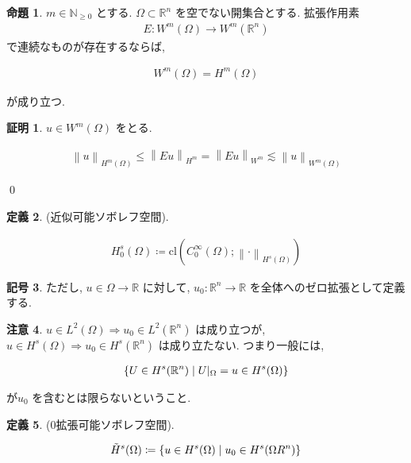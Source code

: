 \documentclass[10pt, fleqn, label-section=none]{bxjsarticle}
\theoremstyle{definition}
\newtheorem{dfn}{定義}[section]
\newtheorem{prop}[dfn]{命題}
\newtheorem{notation}[dfn]{記号}
\newtheorem*{pf*}{証明}
\newtheorem{remark}[dfn]{注意}
\newcommand{\cbra}[1]{\mleft\{#1\mright\}}
\newcommand{\norm}[1]{\left\|#1\right\|}
\newcommand{\naraba}{\Rightarrow}
\renewcommand{\;}{\, ; \,}
\begin{document}
\begin{prop}$m \in \mathbb N_{\geq 0 }$ とする. $\Omega \subset \mathbb R^n$ を空でない開集合とする. 拡張作用素
\begin{align*} E: W^m(\Omega) \rightarrow W^m(\mathbb R^n) \end{align*}
で連続なものが存在するならば, 

\begin{align*} W^m(\Omega) = H^m(\Omega ) \end{align*}

が成り立つ. 

\end{prop}
\begin{pf*}$u \in W^m(\Omega)$ をとる. 

\begin{align*} \norm u _{H^m(\Omega)} \leq \norm{Eu}_{H^m} = \norm{Eu}_{W^m} \lesssim \norm{u}_{W^m(\Omega)} \end{align*}

\qed
\end{pf*}




\begin{dfn}(近似可能ソボレフ空間). 

\begin{align*} H_0^s (\Omega ) \coloneqq \textrm{cl}(C_0^\infty(\Omega) ; \norm{\cdot}_{H^s(\Omega)} ) \end{align*}

\end{dfn}

\begin{notation}
ただし, $u \in \Omega \rightarrow \mathbb R$ に対して, $u_0: \mathbb R^n \rightarrow \mathbb R $ を全体へのゼロ拡張として定義する.  
\end{notation}

\begin{remark}$u \in L^2(\Omega )  \naraba u_0 \in L^2(\mathbb R^n)$ は成り立つが, $u \in H^s(\Omega ) \naraba u_0 \in H^s(\mathbb R^n)$ は成り立たない. つまり一般には, 

\begin{align*}  \cbra{U \in H^s(\mathbb R^n ) \mid U|_\Omega = u \in H^s(\Omega) }\end{align*}

が$u_0$ を含むとは限らないということ. 

\end{remark}




\begin{dfn}($0$拡張可能ソボレフ空間). 

\begin{align*} \tilde H^s (\Omega) \coloneqq \cbra{u \in H^s(\Omega ) \mid u_0 \in H^s(\Omega R^n) }\end{align*}



\end{dfn}
\end{document}
